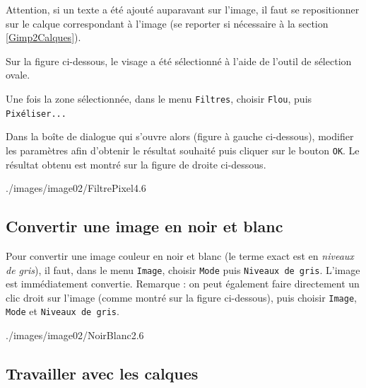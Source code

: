 \vspace{6pt}

Attention, si un texte a été ajouté auparavant sur l'image, il faut se repositionner sur le calque correspondant à l'image (se reporter si nécessaire à la section \vref{Gimp2Calques}). 

\vspace{6pt}

Sur la figure ci-dessous, le visage a été sélectionné à l'aide de l'outil de sélection ovale.


Une fois la zone sélectionnée, dans le menu \texttt{Filtres}, choisir \texttt{Flou}, puis \texttt{Pixéliser...}   


Dans la boîte de dialogue qui s'ouvre alors (figure à gauche ci-dessous), modifier les paramètres afin d'obtenir le résultat souhaité puis cliquer sur le bouton \texttt{OK}. Le résultat obtenu est montré sur la figure de droite ci-dessous.

%
              {./images/image02/FiltrePixel4}{.6\textwidth}




\subsection{Convertir une image en noir et blanc}\label{Gimp2ConvertirNoirBlanc}

 Pour convertir une image couleur en noir et blanc (le terme exact est en \emph{niveaux de gris}), il faut, dans le menu \texttt{Image}, choisir \texttt{Mode} puis \texttt{Niveaux de gris}. L'image est immédiatement convertie. Remarque : on peut également faire directement un clic droit sur l'image (comme montré sur la figure ci-dessous), puis choisir \texttt{Image}, \texttt{Mode} et \texttt{Niveaux de gris}.

%
              {./images/image02/NoirBlanc2}{.6\textwidth}




\subsection{Travailler avec les calques}\label{Gimp2Calques}

